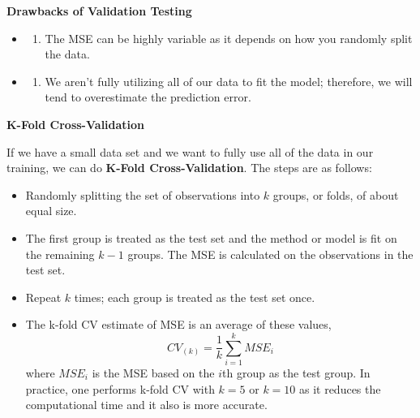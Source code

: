 \documentclass[]{book}
\newenvironment{Shaded}{\begin{snugshade}}{\end{snugshade}}
\newcommand{\CommentTok}[1]{\textcolor[rgb]{0.56,0.35,0.01}{\textit{#1}}}
\newcommand{\DataTypeTok}[1]{\textcolor[rgb]{0.13,0.29,0.53}{#1}}
\newcommand{\DecValTok}[1]{\textcolor[rgb]{0.00,0.00,0.81}{#1}}
\newcommand{\KeywordTok}[1]{\textcolor[rgb]{0.13,0.29,0.53}{\textbf{#1}}}
\newcommand{\NormalTok}[1]{#1}
\newcommand{\OperatorTok}[1]{\textcolor[rgb]{0.81,0.36,0.00}{\textbf{#1}}}
\newcommand{\StringTok}[1]{\textcolor[rgb]{0.31,0.60,0.02}{#1}}
\providecommand{\tightlist}{%
  \setlength{\itemsep}{0pt}\setlength{\parskip}{0pt}}
\begin{document}
\textbf{Drawbacks of Validation Testing}

\begin{itemize}
\item
  \begin{enumerate}
  \def\labelenumi{\arabic{enumi})}
  \tightlist
  \item
    The MSE can be highly variable as it depends on how you randomly split the data.
  \end{enumerate}
\item
  \begin{enumerate}
  \def\labelenumi{\arabic{enumi})}
  \setcounter{enumi}{1}
  \tightlist
  \item
    We aren't fully utilizing all of our data to fit the model; therefore, we will tend to overestimate the prediction error.
  \end{enumerate}
\end{itemize}

\textbf{K-Fold Cross-Validation}

If we have a small data set and we want to fully use all of the data in our training, we can do \textbf{K-Fold Cross-Validation}. The steps are as follows:

\begin{itemize}
\item
  Randomly splitting the set of observations into \(k\) groups, or folds, of about equal size.
\item
  The first group is treated as the test set and the method or model is fit on the remaining \(k-1\) groups. The MSE is calculated on the observations in the test set.
\item
  Repeat \(k\) times; each group is treated as the test set once.
\item
  The k-fold CV estimate of MSE is an average of these values,
  \[CV_{(k)} = \frac{1}{k}\sum^k_{i=1}MSE_i \]
  where \(MSE_i\) is the MSE based on the \(i\)th group as the test group. In practice, one performs k-fold CV with \(k=5\) or \(k=10\) as it reduces the computational time and it also is more accurate.
\end{itemize}

\begin{Shaded}
\end{Shaded}
\end{document}
